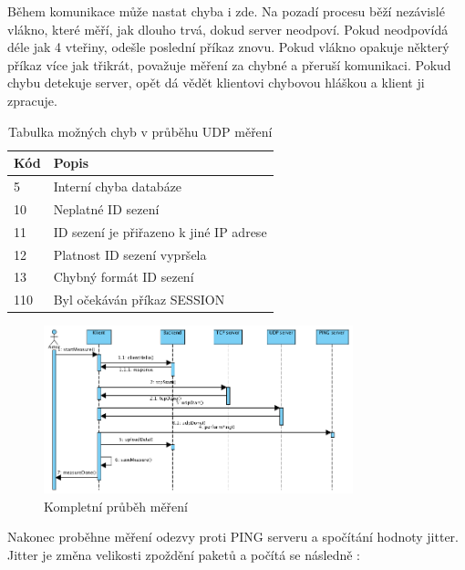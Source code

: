 \newpage

Během komunikace může nastat chyba i zde. Na pozadí procesu běží nezávislé vlákno, které měří, jak dlouho trvá, dokud server neodpoví. Pokud neodpovídá déle jak 4 vteřiny, odešle poslední příkaz znovu. Pokud vlákno opakuje některý příkaz více jak třikrát, považuje měření za chybné a přeruší komunikaci. Pokud chybu detekuje server, opět dá vědět klientovi chybovou hláškou a klient ji zpracuje.

\begin{table}[h]
	\begin{center}
		\begin{tabular}{|l|l|}
			\hline
				{\bf Kód} & {\bf Popis}\\
			\hline \hline
				5 & Interní chyba databáze\\
				\hline
				10 & Neplatné ID sezení\\
				\hline
				11 & ID sezení je přiřazeno k jiné IP adrese\\
				\hline
				12 & Platnost ID sezení vypršela\\
				\hline
				13 & Chybný formát ID sezení\\
				\hline
				110 & Byl očekáván příkaz SESSION\\
				\hline
		\end{tabular}
	\end{center}
	\caption{Tabulka možných chyb v průběhu UDP měření}
	\label{tab.udp}
\end{table}

\begin{figure}[h]
	\centering
    \includegraphics[width=0.8\textwidth]{figures/03_implementation/seq_diagram.jpg}
    \caption{Kompletní průběh měření}
    \label{err1}
\end{figure}

Nakonec proběhne měření odezvy proti PING serveru a spočítání hodnoty jitter. Jitter je změna velikosti zpoždění paketů a počítá se následně \cite{RFC}:

